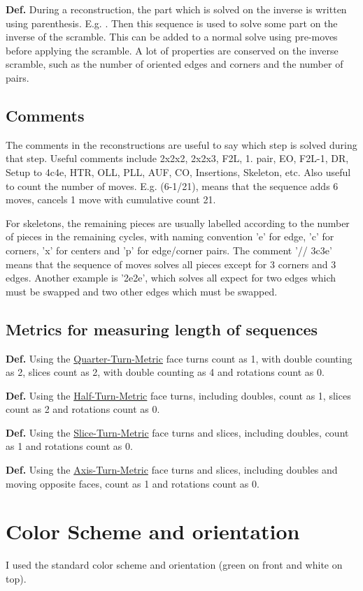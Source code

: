 \textbf{Def.} During a reconstruction, the part which is solved on the inverse is written using parenthesis. E.g. . Then this sequence is used to solve some part on the inverse of the scramble. This can be added to a normal solve using pre-moves before applying the scramble. A lot of properties are conserved on the inverse scramble, such as the number of oriented edges and corners and the number of pairs.


\subsection*{Comments}

The comments in the reconstructions are useful to say which step is solved during that step. Useful comments include 2x2x2, 2x2x3, F2L, 1. pair, EO, F2L-1, DR, Setup to 4c4e, HTR, OLL, PLL, AUF, CO, Insertions, Skeleton, etc. Also useful to count the number of moves. E.g. (6-1/21), means that the sequence adds 6 moves, cancels 1 move with cumulative count 21.

For skeletons, the remaining pieces are usually labelled according to the number of pieces in the remaining cycles, with naming convention 'e' for edge, 'c' for corners, 'x' for centers and 'p' for edge/corner pairs. The comment '// 3c3e' means that the sequence of moves solves all pieces except for 3 corners and 3 edges. Another example is '2e2e', which solves all expect for two edges which must be swapped and two other edges which must be swapped.  

\subsection*{Metrics for measuring length of sequences}

\textbf{Def.} Using the \underline{Quarter-Turn-Metric} face turns count as 1, with double counting as 2, slices count as 2, with double counting as 4 and rotations count as 0.

\textbf{Def.} Using the \underline{Half-Turn-Metric} face turns, including doubles, count as 1, slices count as 2 and rotations count as 0.

\textbf{Def.} Using the \underline{Slice-Turn-Metric} face turns and slices, including doubles, count as 1 and rotations count as 0.

\textbf{Def.} Using the \underline{Axis-Turn-Metric} face turns and slices, including doubles and moving opposite faces, count as 1 and rotations count as 0.

\section{Color Scheme and orientation}
\SolvedCube

I used the standard color scheme and orientation (green on front and white on top).
\begin{center}
\end{center}